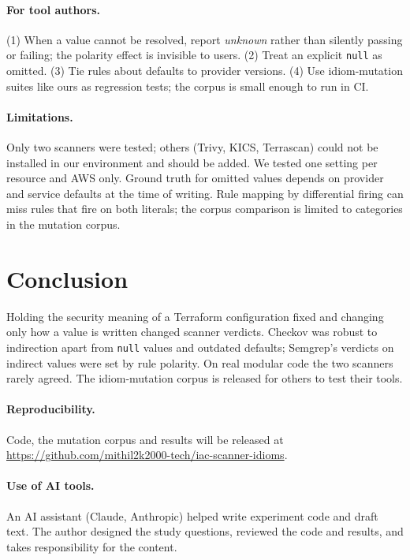 \documentclass[11pt]{article}
\begin{document}
\paragraph{For tool authors.} (1) When a value cannot be resolved, report \emph{unknown} rather than silently passing or failing; the
polarity effect is invisible to users. (2) Treat an explicit \texttt{null} as omitted. (3) Tie rules about defaults to provider
versions. (4) Use idiom-mutation suites like ours as regression tests; the corpus is small enough to run in CI.

\paragraph{Limitations.} Only two scanners were tested; others (Trivy, KICS, Terrascan) could not be installed in our environment and
should be added. We tested one setting per resource and AWS only. Ground truth for omitted values depends on provider and service
defaults at the time of writing. Rule mapping by differential firing can miss rules that fire on both literals; the corpus comparison
is limited to categories in the mutation corpus.

\section{Conclusion}
Holding the security meaning of a Terraform configuration fixed and changing only how a value is written changed scanner verdicts.
Checkov was robust to indirection apart from \texttt{null} values and outdated defaults; Semgrep's verdicts on indirect values were set by
rule polarity. On real modular code the two scanners rarely agreed. The idiom-mutation corpus is released for others to test their
tools.

\paragraph{Reproducibility.} Code, the mutation corpus and results will be released at
\newline\url{https://github.com/mithil2k2000-tech/iac-scanner-idioms}.

\paragraph{Use of AI tools.} An AI assistant (Claude, Anthropic) helped write experiment code and draft text. The author designed the
study questions, reviewed the code and results, and takes responsibility for the content.



\end{document}
